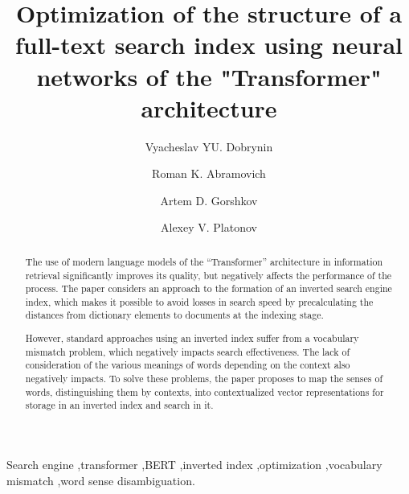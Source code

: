 \documentclass[
    twocolumn,
]{template/ceurart}
\begin{document}
    \title{Optimization of the structure of a full-text search index using neural networks of the "Transformer" architecture}
    \author[1]{Vyacheslav YU. Dobrynin}
    \author[1]{Roman K. Abramovich}
    \author[1]{Artem D. Gorshkov}
    \author[1]{Alexey V. Platonov}
    \address[1]{ITMO University, Kronverksky Pr. 49, bldg. A, Saint-Petersburg, 197101, Russian Federation}
    \begin{abstract}
        The use of modern language models of the ``Transformer'' architecture in information retrieval significantly
        improves its quality, but negatively affects the performance of the process.
        The paper considers an approach to the formation of an inverted search engine index,
        which makes it possible to avoid losses in search speed by precalculating the distances from dictionary
        elements to documents at the indexing stage.

        However, standard approaches using an inverted index suffer from a vocabulary mismatch problem,
        which negatively impacts search effectiveness.
        The lack of consideration of the various meanings of words depending on the context also negatively impacts.
        To solve these problems, the paper proposes to map the senses of words, distinguishing them by contexts,
        into contextualized vector representations for storage in an inverted index and search in it.
    \end{abstract}
    \begin{keywords}
        Search engine \sep transformer \sep BERT \sep inverted index \sep optimization \sep vocabulary mismatch
        \sep word sense disambiguation.
    \end{keywords}
    \maketitle
\end{document}
